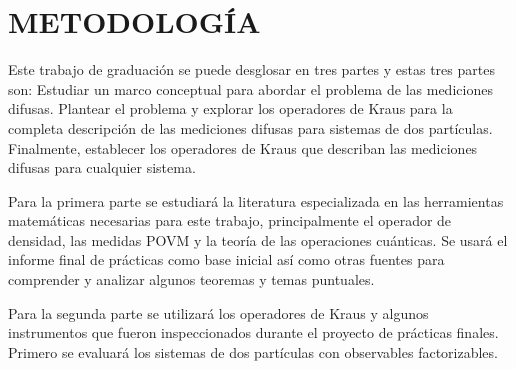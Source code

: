 \chapter*{METODOLOGÍA} 

Este trabajo de graduación se puede desglosar en tres partes y estas tres partes son: Estudiar un marco conceptual para abordar el problema de las mediciones difusas. Plantear el problema y explorar los operadores de Kraus para la completa descripción de las mediciones difusas para sistemas de dos partículas. Finalmente, establecer los operadores de Kraus que describan las mediciones difusas para cualquier sistema.



Para la primera parte se estudiará la literatura especializada en las herramientas matemáticas necesarias para este trabajo, principalmente el operador de densidad, las medidas POVM y la teoría de las operaciones cuánticas. Se usará el informe final de prácticas como base inicial así como  otras fuentes para comprender y analizar algunos teoremas y temas puntuales.




Para la segunda parte se utilizará los operadores de Kraus y algunos instrumentos que fueron inspeccionados durante el proyecto de prácticas finales. Primero se evaluará los sistemas de dos partículas con observables factorizables.
